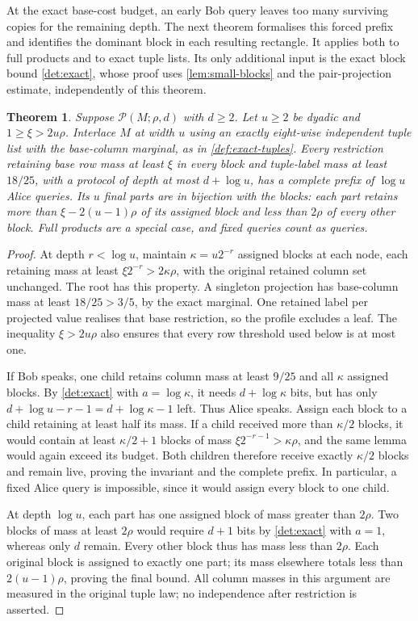 \documentclass[11pt]{article} \usepackage[utf8]{inputenc}
\theoremstyle{plain} \newtheorem{theorem}{Theorem}[section]
\theoremstyle{definition} \newaliascnt{definition}{theorem}
\newcommand{\RP}[3]{\mathcal{P}(#1;#2,#3)}
\begin{document}
At the exact base-cost budget, an early Bob query leaves too many surviving
copies for the remaining depth. The next theorem formalises this forced prefix
and identifies the dominant block in each resulting rectangle. It applies both
to full products and to exact tuple lists. Its only additional input is the
exact block bound \cref{det:exact}, whose proof uses \cref{lem:small-blocks}
and the pair-projection estimate, independently of this theorem.

\begin{theorem}\label{cl:separation}
Suppose $\RP{M}{\rho}{d}$ with $d\ge2$. Let $u\ge2$ be dyadic and
$1\ge\xi>2u\rho$. Interlace $M$ at width $u$ using an exactly eight-wise independent
tuple list with the base-column marginal, as in \cref{def:exact-tuples}.
Every restriction retaining base row mass at least $\xi$ in every block
and tuple-label mass at least $18/25$, with a protocol of depth at most
$d+\log u$, has a complete prefix of $\log u$ Alice queries.
Its $u$ final parts are in bijection with the blocks: each part retains more
than $\xi-2(u-1)\rho$ of its assigned block and less than $2\rho$ of every
other block. Full products are a special case, and fixed queries count as
queries.
\end{theorem}

\begin{proof}
At depth $r<\log u$, maintain $\kappa=u2^{-r}$ assigned blocks at each node,
each retaining mass at least $\xi2^{-r}>2\kappa\rho$, with the original
retained column set unchanged. The root has this property. A singleton
projection has base-column mass at least $18/25>3/5$, by the exact marginal.
One retained label per projected value realises that base restriction, so
the profile excludes a leaf. The inequality $\xi>2u\rho$ also ensures
that every row threshold used below is at most one.

If Bob speaks, one child retains column mass at least $9/25$ and all
$\kappa$ assigned blocks. By \cref{det:exact} with $a=\log\kappa$,
it needs $d+\log\kappa$ bits, but has only
$d+\log u-r-1=d+\log\kappa-1$ left. Thus Alice speaks. Assign each block
to a child retaining at least half its mass. If a child received more than
$\kappa/2$ blocks, it would contain at least $\kappa/2+1$ blocks of mass
$\xi2^{-r-1}>\kappa\rho$, and the same lemma would again exceed its budget.
Both children therefore receive exactly $\kappa/2$ blocks and remain live,
proving the invariant and the complete prefix. In particular, a fixed Alice
query is impossible, since it would assign every block to one child.

At depth $\log u$, each part has one assigned block of mass greater than
$2\rho$. Two blocks of mass at least $2\rho$ would require $d+1$ bits by
\cref{det:exact} with $a=1$, whereas only $d$ remain. Every other block thus has
mass less than $2\rho$. Each original block is assigned to exactly one part;
its mass elsewhere totals less than $2(u-1)\rho$, proving the final bound.
All column masses in this argument are measured in the original tuple law;
no independence after restriction is asserted.
\end{proof}
\end{document}
